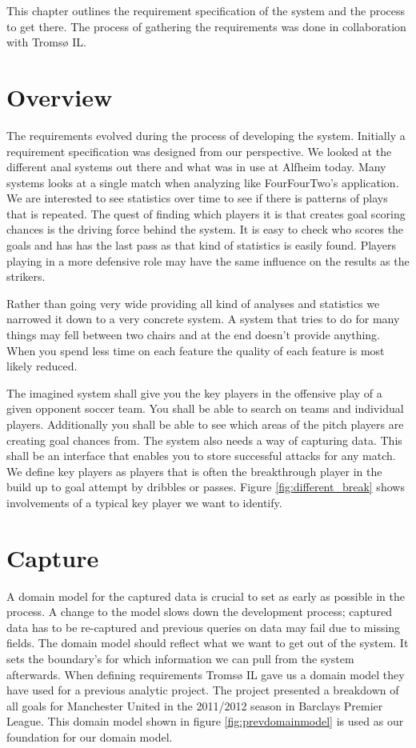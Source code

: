 This chapter outlines the requirement specification of the system and the process to get there. The process of gathering the requirements was done in collaboration with Tromsø IL.

\section{Overview}
The requirements evolved during the process of developing the system. Initially a requirement specification was designed from our perspective. We looked at the different anal systems out there and what was in use at Alfheim today. Many systems looks at a single match when analyzing like FourFourTwo’s application. We are interested to see statistics over time to see if there is patterns of plays that is repeated. The quest of finding which players it is that creates goal scoring chances is the driving force behind the system. It is easy to check who scores the goals and has has the last pass as that kind of statistics is easily found. Players playing in a more defensive role may have the same influence on the results as the strikers.

Rather than going very wide providing all kind of analyses and statistics we narrowed it down to a very concrete system. A system that tries to do for many things may fell between two chairs and at the end doesn't provide anything. When you spend less time on each feature the quality of each feature is most likely reduced.

The imagined system shall give you the key players in the offensive play of a given opponent soccer team. You shall be able to search on teams and individual players. Additionally you shall be able to see which areas of the pitch players are creating goal chances from. The system also needs a way of capturing data. This shall be an interface that enables you to store successful attacks for any match. We define key players as players that is often the breakthrough player in the build up to goal attempt by dribbles or passes. Figure \ref{fig:different_break} shows involvements of a typical key player we want to identify.

\section{Capture}

A domain model for the captured data is crucial to set as early as possible in the process. A change to the model slows down the development process; captured data has to be re-captured and previous queries on data may fail due to missing fields. The domain model should reflect what we want to get out of the system. It sets the boundary's for which information we can pull from the system afterwards. When defining requirements Tromsø IL gave us a domain model they have used for a previous analytic project. The project presented a breakdown of all goals for Manchester United in the 2011/2012 season in Barclays Premier League. This domain model shown in figure \ref{fig:prevdomainmodel} is used as our foundation for our domain model. 

